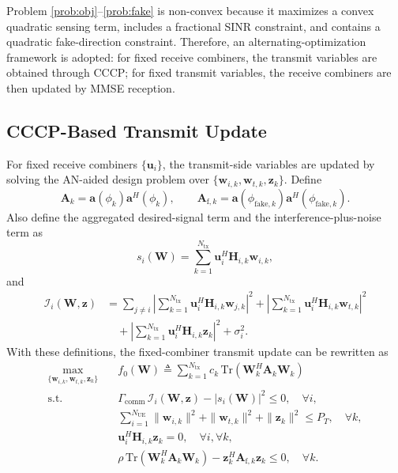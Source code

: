\documentclass[conference,twocolumn,a4paper]{IEEEtran}
\begin{document}
Problem \eqref{prob:obj}--\eqref{prob:fake} is non-convex because it maximizes a convex quadratic sensing term, includes a fractional SINR constraint, and contains a quadratic fake-direction constraint. Therefore, an alternating-optimization framework is adopted: for fixed receive combiners, the transmit variables are obtained through CCCP; for fixed transmit variables, the receive combiners are then updated by MMSE reception.

\subsection{CCCP-Based Transmit Update}
For fixed receive combiners $\{\mathbf{u}_i\}$, the transmit-side variables are updated by solving the AN-aided design problem over $\{\mathbf{w}_{i,k},\mathbf{w}_{t,k},\mathbf{z}_k\}$. Define
\begin{equation}
\mathbf{A}_k=\mathbf{a}(\phi_k)\mathbf{a}^H(\phi_k), \qquad \mathbf{A}_{\mathrm{f},k}=\mathbf{a}(\phi_{\mathrm{fake},k})\mathbf{a}^H(\phi_{\mathrm{fake},k}).
\end{equation}
Also define the aggregated desired-signal term and the interference-plus-noise term as
\begin{equation}
s_i(\mathbf{W})=\sum_{k=1}^{N_{\mathrm{tx}}}\mathbf{u}_i^H\mathbf{H}_{i,k}\mathbf{w}_{i,k},
\label{eq:si-def}
\end{equation}
and
\begin{align}
\mathcal{I}_i(\mathbf{W},\mathbf{z})
&=\sum_{j\neq i}\left|\sum_{k=1}^{N_{\mathrm{tx}}}\mathbf{u}_i^H\mathbf{H}_{i,k}\mathbf{w}_{j,k}\right|^2
+\left|\sum_{k=1}^{N_{\mathrm{tx}}}\mathbf{u}_i^H\mathbf{H}_{i,k}\mathbf{w}_{t,k}\right|^2 \nonumber\\
&\quad+\left|\sum_{k=1}^{N_{\mathrm{tx}}}\mathbf{u}_i^H\mathbf{H}_{i,k}\mathbf{z}_k\right|^2+\sigma_i^2.
\label{eq:Ii-def}
\end{align}
With these definitions, the fixed-combiner transmit update can be rewritten as
\begin{subequations}
\begin{align}
\max_{\{\mathbf{w}_{i,k},\mathbf{w}_{t,k},\mathbf{z}_k\}} \quad
& f_0(\mathbf{W})\triangleq\sum_{k=1}^{N_{\mathrm{tx}}}c_k\,\mathrm{Tr}(\mathbf{W}_k^H\mathbf{A}_k\mathbf{W}_k)
\label{eq:tx-orig-obj}\\
\text{s.t.}\quad
& \Gamma_{\mathrm{comm}}\,\mathcal{I}_i(\mathbf{W},\mathbf{z})-|s_i(\mathbf{W})|^2\le 0,\quad \forall i,
\label{eq:tx-orig-sinr}\\
& \sum_{i=1}^{N_{\mathrm{UE}}}\|\mathbf{w}_{i,k}\|^2+\|\mathbf{w}_{t,k}\|^2+\|\mathbf{z}_k\|^2\le P_T,\quad \forall k,
\label{eq:tx-orig-power}\\
& \mathbf{u}_i^H\mathbf{H}_{i,k}\mathbf{z}_k=0,\quad \forall i,\forall k,
\label{eq:tx-orig-null}\\
& \rho\,\mathrm{Tr}(\mathbf{W}_k^H\mathbf{A}_k\mathbf{W}_k)-\mathbf{z}_k^H\mathbf{A}_{\mathrm{f},k}\mathbf{z}_k\le 0,\quad \forall k.
\label{eq:tx-orig-fake}
\end{align}
\label{eq:tx-orig}
\end{subequations}
\end{document}
